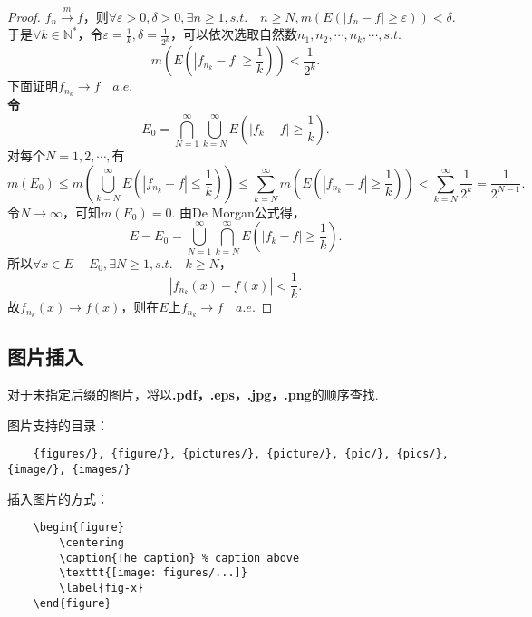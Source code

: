 \documentclass[bwprint, withouttitlepage]{mathexpthesis}
\begin{document}
\begin{proof}
    $f_n \stackrel{m}{\longrightarrow} f$，则$\forall \varepsilon > 0, \delta > 0, \exists n \geqslant 1, s.t. \quad n \geqslant N, m(E(|f_n - f| \geqslant \varepsilon)) < \delta$.
    于是$\forall k \in \mathbb{N}^*$，令$\varepsilon = \frac{1}{k}, \delta = \frac{1}{2^k}$，可以依次选取自然数$n_1, n_2, \cdots, n_k, \cdots, s.t.$
    \begin{equation*}
        m(E(|f_{n_k} - f| \geqslant \frac{1}{k})) < \frac{1}{2^k}.
    \end{equation*}
    下面证明$f_{n_k} \to f \quad a.e.$ \\
    \textbf{令\[E_0 = \bigcap_{N = 1}^{\infty}{\bigcup_{k = N}^{\infty}{E(|f_k - f| \geqslant \frac{1}{k})}}.\]}
    对每个$N = 1, 2, \cdots, $有
    \begin{equation*}
        m(E_0) \leqslant m(\bigcup_{k = N}^{\infty}{E(|f_{n_k} - f| \leqslant \frac{1}{k})}) \leqslant \sum_{k = N}^{\infty}{m(E(|f_{n_k} - f| \geqslant \frac{1}{k}))} < \sum_{k = N}^{\infty}{\frac{1}{2^k}} = \frac{1}{2^{N - 1}}.
    \end{equation*}
    令$N \to \infty$，可知$m(E_0) = 0$.
    由De Morgan公式得，
    \begin{equation*}
        E - E_0 = \bigcup_{N = 1}^{\infty}{\bigcap_{k = N}^{\infty}{E(|f_k - f| \geqslant \frac{1}{k})}}.
    \end{equation*}
    所以$\forall x \in E - E_0, \exists N \geqslant 1, s.t. \quad k \geqslant N$，
    \begin{equation*}
        |f_{n_k}(x) - f(x)| < \frac{1}{k}.
    \end{equation*}
    故$f_{n_k}(x) \to f(x)$，则在$E$上$f_{n_k} \to f \quad a.e.$
\end{proof}

\subsection{图片插入}
对于未指定后缀的图片，将以\textbf{.pdf，.eps，.jpg，.png}的顺序查找.

图片支持的目录：
\begin{verbatim}
    {figures/}, {figure/}, {pictures/}, {picture/}, {pic/}, {pics/}, {image/}, {images/}
\end{verbatim}

插入图片的方式：
\begin{verbatim}
    \begin{figure}
        \centering
        \caption{The caption} % caption above
        \texttt{[image: figures/...]}
        \label{fig-x}
    \end{figure}
\end{verbatim}
\end{document}

